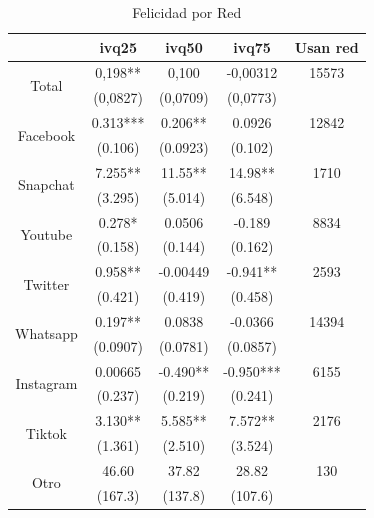 
\begin{table}[htbp]
  \centering
  \caption{Felicidad por Red}
    \begin{tabular}{ccccc}
          & \textbf{ivq25} & \textbf{ivq50} & \textbf{ivq75} & \textbf{Usan red} \\
    \midrule
    \multirow{2}[2]{*}{Total} & 0,198** & 0,100 & -0,00312 & 15573 \\
          & (0,0827) & (0,0709) & (0,0773) &  \\
    \midrule
    \multirow{2}[2]{*}{Facebook} & 0.313*** & 0.206** & 0.0926 & 12842 \\
          & (0.106) & (0.0923) & (0.102) &  \\
    \midrule
    \multirow{2}[2]{*}{Snapchat} & 7.255** & 11.55** & 14.98** & 1710 \\
          & (3.295) & (5.014) & (6.548) &  \\
    \midrule
    \multirow{2}[2]{*}{Youtube} & 0.278* & 0.0506 & -0.189 & 8834 \\
          & (0.158) & (0.144) & (0.162) &  \\
    \midrule
    \multirow{2}[2]{*}{Twitter} & 0.958** & -0.00449 & -0.941** & 2593 \\
          & (0.421) & (0.419) & (0.458) &  \\
    \midrule
    \multirow{2}[2]{*}{Whatsapp} & 0.197** & 0.0838 & -0.0366 & 14394 \\
          & (0.0907) & (0.0781) & (0.0857) &  \\
    \midrule
    \multirow{2}[2]{*}{Instagram} & 0.00665 & -0.490** & -0.950*** & 6155 \\
          & (0.237) & (0.219) & (0.241) &  \\
    \midrule
    \multirow{2}[2]{*}{Tiktok} & 3.130** & 5.585** & 7.572** & 2176 \\
          & (1.361) & (2.510) & (3.524) &  \\
    \midrule
    \multirow{2}[2]{*}{Otro} & 46.60 & 37.82 & 28.82 & 130 \\
          & (167.3) & (137.8) & (107.6) &  \\
    \bottomrule

    \end{tabular}%
  \label{por_red}%
\end{table}%
